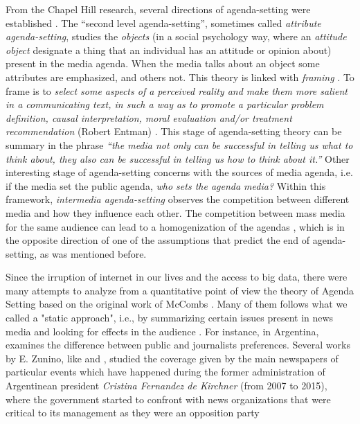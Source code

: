 \documentclass[a4paper, 12pt]{article}
\begin{document}
\par From the Chapel Hill research, several directions of agenda-setting were established \cite{mccombs2005look}.
The ``second level agenda-setting'', sometimes called \textit{attribute agenda-setting}, studies the \textit{objects} (in a social psychology way, where an \textit{attitude object} designate a thing that an individual has an attitude or opinion about) present in the media agenda. When the media talks about an object some attributes are emphasized, and others not. 
This theory is linked with \textit{framing} \cite{guggenheim2015dynamics, tsur2015frame}. 
To frame is to \textit{select some aspects of a perceived reality and make them more salient in a communicating text, in such a way as to promote a particular problem definition, causal interpretation, moral evaluation and/or treatment recommendation} (Robert Entman) \cite{mccombs2005look}.
This stage of agenda-setting theory can be summary in the phrase \textit{``the media not only can be successful in telling us what to think about, they also can be successful in telling us how to think about it.''} 
Other interesting stage of agenda-setting concerns with the sources of media agenda, i.e. if the media set the public agenda, \textit{who sets the agenda media?} Within this framework, \textit{intermedia agenda-setting} observes the competition between different media and how they influence each other. The competition between mass media for the same audience can lead to a homogenization of the agendas \cite{vargo2017networks}, which is in the opposite direction of one of the assumptions that predict the end of agenda-setting, as was mentioned before.




\par Since the irruption of internet in our lives and the access to big data, there were many attempts to analyze from a quantitative point of view the theory of Agenda Setting based on  the original work of McCombs \cite{mccombs1972agenda}. Many of them follows what we called a "static approach", i.e., by summarizing certain issues present in news media and looking for effects in the audience \cite{brians1996campaign, gerber2009does, coleman2007young}.
For instance, in Argentina, \cite{mitchelstein2016brecha} examines the difference between public and journalists preferences. 
Several works by E. Zunino, like \cite{zunino2010cobertura} and \cite{koziner2013cobertura}, studied the coverage given by the main newspapers of particular events which have happened during the former administration of Argentinean president \emph{Cristina Fernandez de Kirchner} (from 2007 to 2015), where the government started to confront with news organizations that were critical to its management as they were an opposition party \cite{mitchelstein2017information}
\end{document}
